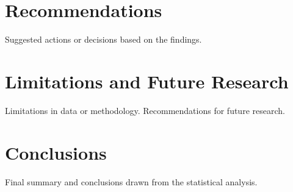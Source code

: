 \documentclass[12pt]{article}
\begin{document}
\section{Recommendations}

Suggested actions or decisions based on the findings.

\section{Limitations and Future Research}

Limitations in data or methodology.
Recommendations for future research.

\section{Conclusions}

Final summary and conclusions drawn from the statistical analysis.


\newpage
%
%

\setlength{\bibhang}{0pt}

\raggedright

\end{document}
